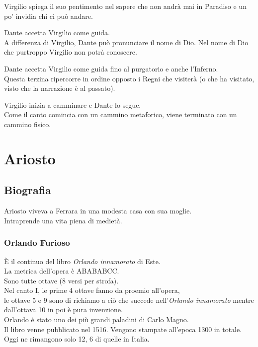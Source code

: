 \documentclass{article}
\begin{document}

Virgilio spiega il suo pentimento nel sapere che non andrà mai in Paradiso e un po' invidia chi ci può andare.


Dante accetta Virgilio come guida.\\
A differenza di Virgilio, Dante può pronunciare il nome di Dio. Nel nome di Dio che purtroppo Virgilio non potrà conoscere.


Dante accetta Virgilio come guida fino al purgatorio e anche l'Inferno.\\
Questa terzina ripercorre in ordine opposto i Regni che visiterà (o che ha visitato, visto che la narrazione è al passato).


Virgilio inizia a camminare e Dante lo segue.\\
Come il canto comincia con un cammino metaforico, viene terminato con un cammino fisico.

\newpage
\section{Ariosto}

\subsection{Biografia}

Ariosto viveva a Ferrara in una modesta casa con sua moglie.\\
Intraprende una vita piena di medietà.

\subsubsection{Orlando Furioso}
È il continuo del libro \textit{Orlando innamorato} di Este.\\
La metrica dell'opera è ABABABCC.\\
Sono tutte ottave (8 versi per strofa).\\
Nel canto I, le prime 4 ottave fanno da proemio all'opera,\\
le ottave 5 e 9 sono di richiamo a ciò che succede nell'\textit{Orlando innamorato} mentre dall'ottava 10 in poi è pura invenzione.\\
Orlando è stato uno dei più grandi paladini di Carlo Magno.\\
Il libro venne pubblicato nel 1516. Vengono stampate all'epoca 1300 in totale. Oggi ne rimangono solo 12, 6 di quelle in Italia.
\end{document}
